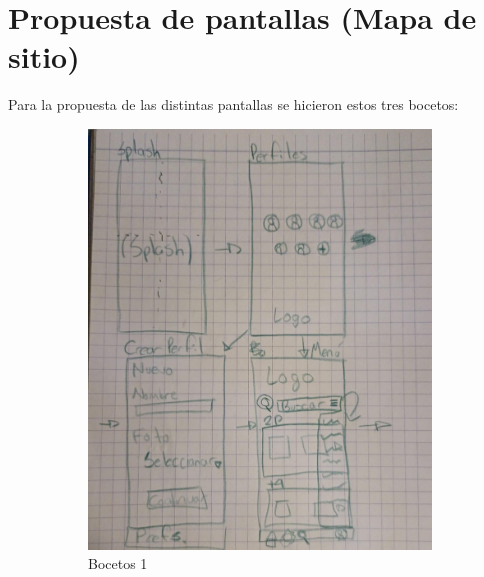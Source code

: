 \documentclass[12pt, oneside, letterpaper]{book}
\begin{document}
\chapter{Propuesta de pantallas (Mapa de sitio) }
\par 
Para la propuesta de las distintas pantallas se hicieron estos tres bocetos: 
\begin{figure}[h]
		\centering
    \begin{subfigure}{.3\textwidth}
        \includegraphics[width=\linewidth]{BocetoInterfacesFN1.jpeg}
        \caption{Bocetos 1 }
        \label{BP1FN}
    \end{subfigure}
		\begin{subfigure}{.3\textwidth}

\end{subfigure}
\end{figure}
\end{document}
